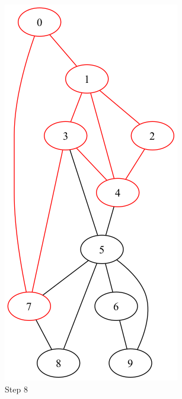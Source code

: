 \documentclass[a4paper,11pt]{report}
\begin{document}
\begin{figure}[htbp]
\begin{subfigure}[b]{0.3\textwidth}
        \includegraphics[height=0.29\textheight]{notebook/assets/aufgabe_07_fleury_step_7.png}
        \caption{Step 8}
        \label{fig:fleury_step_8}
    \end{subfigure}
    \hfill
    \begin{subfigure}[b]{0.3\textwidth}

\end{subfigure}
\end{figure}
\end{document}
